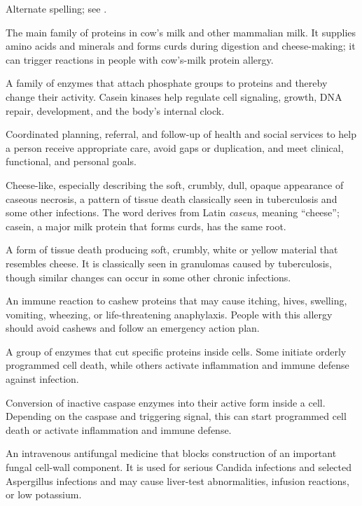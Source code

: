  Alternate spelling; see .

 The main family of proteins in cow's milk and other mammalian milk. It supplies amino acids and minerals and forms curds during digestion and cheese-making; it can trigger reactions in people with cow's-milk protein allergy.

 A family of enzymes that attach phosphate groups to proteins and thereby change their activity. Casein kinases help regulate cell signaling, growth, DNA repair, development, and the body's internal clock.

 Coordinated planning, referral, and follow-up of health and social services to help a person receive appropriate care, avoid gaps or duplication, and meet clinical, functional, and personal goals.

 Cheese-like, especially describing the soft, crumbly, dull, opaque appearance of caseous necrosis, a pattern of tissue death classically seen in tuberculosis and some other infections. The word derives from Latin \textit{caseus}, meaning “cheese”; casein, a major milk protein that forms curds, has the same root.

 A form of tissue death producing soft, crumbly, white or yellow material that resembles cheese. It is classically seen in granulomas caused by tuberculosis, though similar changes can occur in some other chronic infections.

 An immune reaction to cashew proteins that may cause itching, hives, swelling, vomiting, wheezing, or life-threatening anaphylaxis. People with this allergy should avoid cashews and follow an emergency action plan.

 A group of enzymes that cut specific proteins inside cells. Some initiate orderly programmed cell death, while others activate inflammation and immune defense against infection.

 Conversion of inactive caspase enzymes into their active form inside a cell. Depending on the caspase and triggering signal, this can start programmed cell death or activate inflammation and immune defense.

 An intravenous antifungal medicine that blocks construction of an important fungal cell-wall component. It is used for serious Candida infections and selected Aspergillus infections and may cause liver-test abnormalities, infusion reactions, or low potassium.

